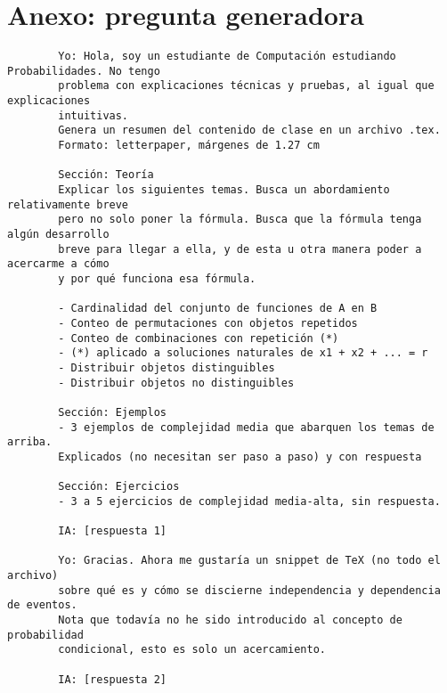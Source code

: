 \documentclass[letterpaper, 12pt]{article}
\begin{document}
	\section*{Anexo: pregunta generadora}
	\begin{verbatim}
		Yo: Hola, soy un estudiante de Computación estudiando Probabilidades. No tengo
		problema con explicaciones técnicas y pruebas, al igual que explicaciones
		intuitivas.
		Genera un resumen del contenido de clase en un archivo .tex.
		Formato: letterpaper, márgenes de 1.27 cm
		
		Sección: Teoría
		Explicar los siguientes temas. Busca un abordamiento relativamente breve
		pero no solo poner la fórmula. Busca que la fórmula tenga algún desarrollo
		breve para llegar a ella, y de esta u otra manera poder a acercarme a cómo
		y por qué funciona esa fórmula.
		
		- Cardinalidad del conjunto de funciones de A en B
		- Conteo de permutaciones con objetos repetidos
		- Conteo de combinaciones con repetición (*)
		- (*) aplicado a soluciones naturales de x1 + x2 + ... = r
		- Distribuir objetos distinguibles
		- Distribuir objetos no distinguibles
		
		Sección: Ejemplos
		- 3 ejemplos de complejidad media que abarquen los temas de arriba.
		Explicados (no necesitan ser paso a paso) y con respuesta
		
		Sección: Ejercicios
		- 3 a 5 ejercicios de complejidad media-alta, sin respuesta. 
		
		IA: [respuesta 1]
		
		Yo: Gracias. Ahora me gustaría un snippet de TeX (no todo el archivo)
		sobre qué es y cómo se discierne independencia y dependencia de eventos.
		Nota que todavía no he sido introducido al concepto de probabilidad
		condicional, esto es solo un acercamiento. 
		
		IA: [respuesta 2]
	\end{verbatim}
\end{document}
